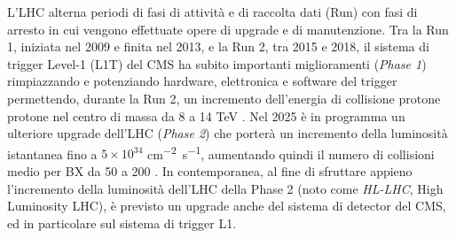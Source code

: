 L'LHC alterna periodi di fasi di attività e di raccolta dati (Run) con fasi di arresto in cui vengono effettuate opere di upgrade e di manutenzione. Tra la Run 1, iniziata nel 2009 e finita nel 2013, e la Run 2, tra 2015 e 2018, il sistema di trigger Level-1 (L1T) del CMS ha subito importanti miglioramenti (\textit{Phase 1}) rimpiazzando e potenziando hardware, elettronica e software del trigger permettendo, durante la Run 2, un incremento dell'energia di collisione protone protone nel centro di massa da 8 a 14 TeV \cite{sirunyan2020performance}. Nel 2025 è in programma un ulteriore upgrade dell'LHC (\textit{Phase 2}) che porterà un incremento della luminosità istantanea fino a $5\times 10^{34}$ \si{cm^{-2} s^{-1}}, aumentando quindi il numero di collisioni medio per BX da 50 a 200 \cite{collaboration2021phase}. In contemporanea, al fine di sfruttare appieno l'incremento della luminosità dell'LHC della Phase 2 (noto come \textit{HL-LHC}, High Luminosity LHC), è previsto un upgrade anche del sistema di detector del CMS, ed in particolare sul sistema di trigger L1. 







